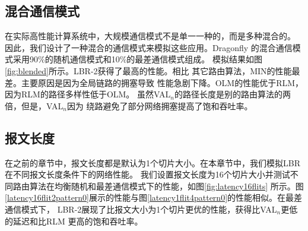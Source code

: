 \subsection{混合通信模式}

在实际高性能计算系统中，大规模通信模式不是单一一种的，而是多种混合的。
因此，我们设计了一种混合的通信模式来模拟这些应用。Dragonfly
的混合通信模式采用90\%的随机通信模式和10\%的最差通信模式组成。
模拟结果如图\ref{fig:blended}所示。LBR-2获得了最高的性能。相比
其它路由算法，MIN的性能最差。主要原因是因为全局链路的拥塞导致
性能急剧下降。OLM的性能优于RLM，因为RLM的路径多样性低于OLM。
虽然VAL$_n$的路径长度是别的路由算法的两倍，但是，VAL$_n$因为
绕路避免了部分网络拥塞提高了饱和吞吐率。


  \begin{figure*}[htbp]
  \centering
  \begin{minipage}[t]{\textwidth}
  \centering
  \caption{混合通信模式}
  \label{fig:blended}
  \end{minipage}
\end{figure*}

\subsection{报文长度}

在之前的章节中，报文长度都是默认为1个切片大小。在本章节中，我们模拟LBR在不同报文长度条件下的网络性能。
我们设置报文长度为16个切片大小并测试不同路由算法在均衡随机和最差通信模式下的性能，如图\ref{fig:latency16flits}
所示。图\ref{latency16flit2pattern0}展示的性能与图\ref{latency1flit4pattern0}的性能相似。在最差通信模式下，
LBR-2展现了比报文大小为1个切片更优的性能，获得比VAL$_n$更低的延迟和比RLM 更高的饱和吞吐率。

\begin{figure*}[htbp]

\centering
  \begin{minipage}[t]{\textwidth}
  \centering
  \caption{报文长度为16个切片的延迟}
  \label{fig:latency16flits}
  \end{minipage}
  \end{figure*}

